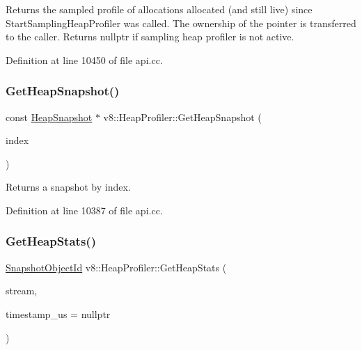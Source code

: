 Returns the sampled profile of allocations allocated (and still live) since Start\+Sampling\+Heap\+Profiler was called. The ownership of the pointer is transferred to the caller. Returns nullptr if sampling heap profiler is not active. 

Definition at line 10450 of file api.\+cc.

\mbox{\label{classv8_1_1HeapProfiler_ad76cc22ab8c91d6bd7a065d97c430aea}} 
\subsubsection{\texorpdfstring{Get\+Heap\+Snapshot()}{GetHeapSnapshot()}}
{\footnotesize\ttfamily const \mbox{\hyperlink{classv8_1_1HeapSnapshot}{Heap\+Snapshot}} $\ast$ v8\+::\+Heap\+Profiler\+::\+Get\+Heap\+Snapshot (\begin{DoxyParamCaption}\item[{\mbox{\hyperlink{classint}{int}}}]{index }\end{DoxyParamCaption})}

Returns a snapshot by index. 

Definition at line 10387 of file api.\+cc.

\mbox{\label{classv8_1_1HeapProfiler_add093717acd067daeddb7ef5fc8b191a}} 
\subsubsection{\texorpdfstring{Get\+Heap\+Stats()}{GetHeapStats()}}
{\footnotesize\ttfamily \mbox{\hyperlink{classuint32__t}{Snapshot\+Object\+Id}} v8\+::\+Heap\+Profiler\+::\+Get\+Heap\+Stats (\begin{DoxyParamCaption}\item[{\mbox{\hyperlink{classv8_1_1OutputStream}{Output\+Stream}} $\ast$}]{stream,  }\item[{\mbox{\hyperlink{classint64__t}{int64\+\_\+t}} $\ast$}]{timestamp\+\_\+us = {\ttfamily nullptr} }\end{DoxyParamCaption})}

